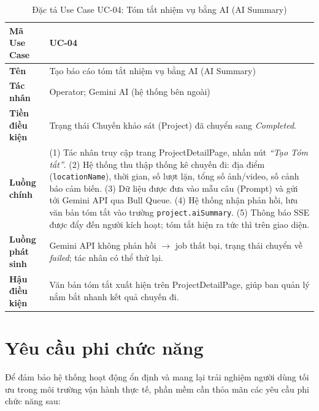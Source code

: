 \documentclass[../DoAn.tex]{subfiles}
\begin{document}
\begin{longtable}{|p{3.5cm}|p{10.0cm}|}
\caption{Đặc tả Use Case UC-04: Tóm tắt nhiệm vụ bằng AI (AI Summary)}\label{tab:uc04}\\
\hline
\textbf{Mã Use Case} & UC-04 \\
\hline
\textbf{Tên} & Tạo báo cáo tóm tắt nhiệm vụ bằng AI (AI Summary) \\
\hline
\textbf{Tác nhân} & Operator; Gemini AI (hệ thống bên ngoài) \\
\hline
\textbf{Tiền điều kiện} & Trạng thái Chuyến khảo sát (Project) đã chuyển sang \textit{Completed}. \\
\hline
\textbf{Luồng chính} &
(1) Tác nhân truy cập trang ProjectDetailPage, nhấn nút \textit{``Tạo Tóm tắt''}. \newline
(2) Hệ thống thu thập thống kê chuyến đi: địa điểm (\texttt{locationName}), thời gian, số lượt lặn, tổng số ảnh/video, số cảnh báo cảm biến. \newline
(3) Dữ liệu được đưa vào mẫu câu (Prompt) và gửi tới Gemini API qua Bull Queue. \newline
(4) Hệ thống nhận phản hồi, lưu văn bản tóm tắt vào trường \texttt{project.aiSummary}. \newline
(5) Thông báo SSE được đẩy đến người kích hoạt; tóm tắt hiện ra tức thì trên giao diện. \\
\hline
\textbf{Luồng phát sinh} & Gemini API không phản hồi $\to$ job thất bại, trạng thái chuyển về \textit{failed}; tác nhân có thể thử lại. \\
\hline
\textbf{Hậu điều kiện} & Văn bản tóm tắt xuất hiện trên ProjectDetailPage, giúp ban quản lý nắm bắt nhanh kết quả chuyến đi. \\
\hline
\end{longtable}

\section{Yêu cầu phi chức năng}
\label{section:2.4}

Để đảm bảo hệ thống hoạt động ổn định và mang lại trải nghiệm người dùng tối ưu trong môi trường vận hành thực tế, phần mềm cần thỏa mãn các yêu cầu phi chức năng sau:
\end{document}
